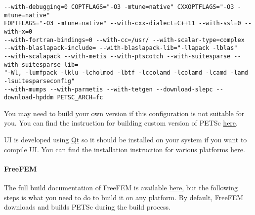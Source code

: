\begin{verbatim}
--with-debugging=0 COPTFLAGS="-O3 -mtune=native" CXXOPTFLAGS="-O3 -mtune=native" 
FOPTFLAGS="-O3 -mtune=native" --with-cxx-dialect=C++11 --with-ssl=0 --with-x=0 
--with-fortran-bindings=0 --with-cc=/usr/ --with-scalar-type=complex
--with-blaslapack-include= --with-blaslapack-lib="-llapack -lblas"
--with-scalapack --with-metis --with-ptscotch --with-suitesparse --with-suitesparse-lib=
"-Wl, -lumfpack -lklu -lcholmod -lbtf -lccolamd -lcolamd -lcamd -lamd -lsuitesparseconfig"
--with-mumps --with-parmetis --with-tetgen --download-slepc --download-hpddm PETSC_ARCH=fc
\end{verbatim}

You may need to build your own version if this configuration is not suitable for you. You can find the instruction for building custom version of PETSc \href{https://petsc.org/release/install/}{here}.

\biodeg{} UI is developed using \href{https://www.qt.io/}{Qt} so it should be installed on your system if you want to compile \biodeg{} UI. You can find the installation instruction for various platforms \href{https://doc.qt.io/qt-5/gettingstarted.html}{here}.

\paragraph{FreeFEM}

The full build documentation of FreeFEM is available \href{https://doc.freefem.org/introduction/installation.html}{here}, but the following steps is what you need to do to build it on any platform. By default, FreeFEM downloads and builds PETSc during the build process.

